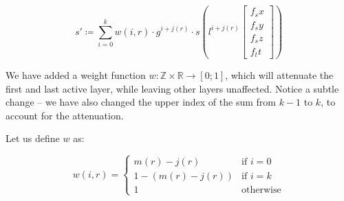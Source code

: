 \begin{equation}\label{eq:fbm3}
    s' \coloneqq \sum_{i=0}^{k} w(i, r) \cdot g^{i+j(r)} \cdot s\left(l^{i+j(r)} \begin{bmatrix}f_sx\\f_sy\\f_sz\\f_tt\end{bmatrix}\right)
\end{equation}

We have added a weight function $w \colon \mathbb{Z} \times \mathbb{R} \to [0; 1]$, which will attenuate the first and last active layer, while leaving other layers unaffected. Notice a subtle change -- we have also changed the upper index of the sum from $k - 1$ to $k$, to account for the attenuation.

Let us define $w$ as:

\begin{equation}
    w(i, r) =
    \begin{cases}
        m(r) - j(r) & \text{if } i = 0 \\
        1 - (m(r) - j(r)) & \text{if } i = k \\
        1 & \text{otherwise}
    \end{cases}
\end{equation}



